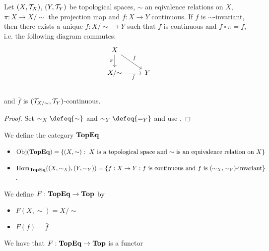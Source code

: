 \documentclass{book}
\begin{document}
	\begin{ex} 
		Let $(X, \mathcal{T}_X)$, $(Y, \mathcal{T}_Y)$ be topological spaces, $\sim$ an eqivalence relations on $X$, $\pi:X \rightarrow X/ {\sim}$ the projection map and $f:X \rightarrow Y$ continuous. If $f$ is $\sim$-invariant, then there exists a unique $\bar{f}:X / {\sim} \rightarrow Y$ such that $\bar{f}$ is continuous and $\bar{f} \circ \pi = f$, i.e. the following diagram commutes:
		\[ 
		\begin{tikzcd}
			X  \arrow[dr, "f"]  \arrow[d, "\pi"']  & \\
			X/ {\sim} \arrow[r, "\bar{f}"'] &  Y  \\
		\end{tikzcd}
		\]
		and $\bar{f}$ is $(\mathcal{T}_{X/ \sim}, \mathcal{T}_Y)$-continuous.
	\end{ex}

	\begin{proof}
		Set $\sim_X \defeq {\sim}$ and $\sim_Y \defeq {=_Y}$ and use .
		
	\end{proof}

	\begin{defn}  
		We define the category $\operatorname*{\text{\textbf{TopEq}}}$ 
		\begin{itemize}
			\item $\operatorname{Obj}(\operatorname*{\text{\textbf{TopEq}}}) = \{(X, \sim):  \text{ $X$ is a topological space and $\sim$ is an equivalence relation on $X$}\}$
			\item $\operatorname{Hom}_{\operatorname*{\text{\textbf{TopEq}}}}((X, \sim_X), (Y, \sim_Y)) = \{f: X \rightarrow Y: \text{$f$ is continuous and $f$ is $(\sim_X, \sim_Y)$-invariant}\}$. 
		\end{itemize}
	\end{defn}

	\begin{defn}  
		We define $F: \operatorname*{\text{\textbf{TopEq}}} \rightarrow \operatorname*{\text{\textbf{Top}}}$ by
		\begin{itemize}
			\item $F(X, \sim) = X/\sim$
			\item $F(f) = \bar{f}$
		\end{itemize}
	\end{defn}

	\begin{ex}  
		We have that $F: \operatorname*{\text{\textbf{TopEq}}} \rightarrow \operatorname*{\text{\textbf{Top}}}$ is a functor
	\end{ex}
\end{document}
